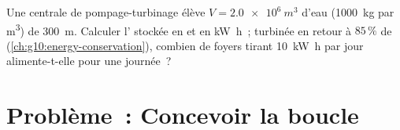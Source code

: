 \begin{exercise}[$\star\star\star$]\label{exo:g11:mechanical-energy:15}
Une centrale de pompage-turbinage élève $V = \qty{2.0e6}{m^3}$ d'eau
(\qty{1000}{kg} par \unit{m^3}) de \qty{300}{m}. Calculer l'
 stockée en
 et en \unit{kW.h}~; turbinée en
retour à $85\,\%$ de
(\cref{ch:g10:energy-conservation}), combien de foyers tirant
\qty{10}{kW.h} par jour alimente-t-elle pour une journée~?
\end{exercise}

\section{Problème~: Concevoir la boucle}

